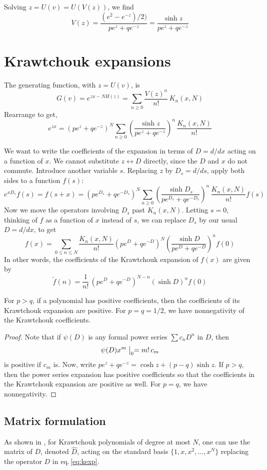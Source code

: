 \documentclass[runningheads]{llncs}
\begin{document}
Solving $z=U(v)=U(V(z))$, we find
$$V(z)=\frac{(e^2-e^{-z})/2)}{pe^z+qe^{-z}}=\frac{\sinh z}{pe^z+qe^{-z}}$$
\section{Krawtchouk expansions}
The generating function, with $z=U(v)$, is
$$G(v)=e^{zx-NH(z)}=\sum_{n\ge0}\frac{V(z)^n}{n!}\,K_n(x,N)$$
Rearrange to get,
$$e^{zx}=(pe^z+qe^{-z})^N\sum_{n\ge0}\left(\frac{\sinh z}{pe^z+qe^{-z}}\right)^n\,\frac{K_n(x,N)}{n!}$$

We want to write the coefficients of the expansion in terms of $D=d/dx$ acting on a function of $x$. We cannot
substitute $z\leftrightarrow D$ directly, since the $D$ and $x$ do not commute. Introduce another variable $s$.
Replacing $z$ by $D_s=d/ds$, apply both sides to a function $f(s)$:
$$e^{xD_s}f(s)=f(s+x)=(pe^{D_s}+qe^{-D_s})^N\sum_{n\ge0}\left(\frac{\sinh D_s}{pe^{D_s}+qe^{-D_s}}\right)^n\,\frac{K_n(x,N)}{n!}f(s)$$
Now we move the operators involving $D_s$ past $K_n(x,N)$.
Letting $s=0$, thinking of $f$ as a function of $x$ instead of $s$, 
we can replace $D_s$ by our usual $D=d/dx$,  to get
$$f(x)=\sum_{0\le n\le N}\frac{K_n(x,N)}{n!}(pe^{D}+qe^{-D})^N\left(\frac{\sinh D}{pe^{D}+qe^{-D}}\right)^nf(0)$$
In other words, the coefficients of the Krawtchouk expansion of $f(x)$ are given by
\begin{equation}\label{eq:kexp}
\tilde f(n)=\frac{1}{n!}\,(pe^{D}+qe^{-D})^{N-n}(\sinh D)^nf(0)
\end{equation}
\begin{theorem} For $p>q$, if a polynomial has positive coefficients, then the coefficients of its Krawtchouk expansion are positive. 
For $p=q=1/2$, we have nonnegativity of the Krawtchouk coefficients.
\end{theorem}
\begin{proof}
Note that if $\psi(D)$ is any formal power series $\sum c_nD^n$ in $D$, then
$$\psi(D)x^m\bigm|_0=m!\,c_m$$
is positive if $c_m$ is. Now, write $pe^z+qe^{-z}=\cosh z+(p-q)\sinh z$. If $p>q$, then the power series expansion has positive coefficients so that 
the coefficients in the Krawtchouk expansion are positive as well. For $p=q$, we have nonnegativity.
\end{proof}

\subsection{Matrix formulation}
As shown in \cite{FS1}, for Krawtchouk polynomials of degree at most $N$, one can use the matrix of $D$, denoted $\hat D$, acting on
the standard basis $\{1, x, x^2,\ldots,x^N\}$ replacing the operator $D$ in eq.\,\eqref{eq:kexp}.\\
\end{document}
